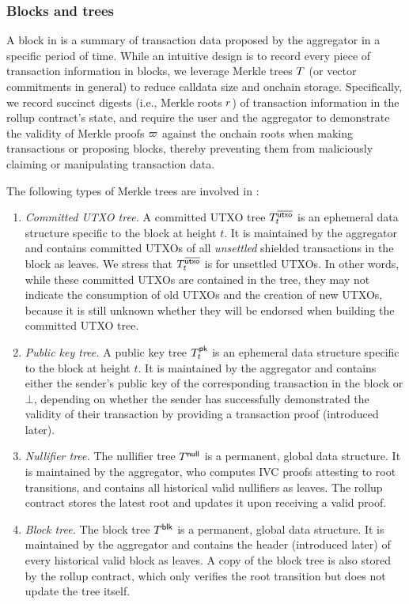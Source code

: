 \subsubsection{Blocks and trees}

A block in \Protocol is a summary of transaction data proposed by the aggregator in a specific period of time.
While an intuitive design is to record every piece of transaction information in blocks, we leverage Merkle trees $T$ (or vector commitments in general) to reduce calldata size and onchain storage.
Specifically, we record succinct digests (i.e., Merkle roots $r$) of transaction information in the rollup contract's state, and require the user and the aggregator to demonstrate the validity of Merkle proofs $\varpi$ against the onchain roots when making transactions or proposing blocks, thereby preventing them from maliciously claiming or manipulating transaction data.

The following types of Merkle trees are involved in \Protocol:

\begin{enumerate}
    \item \textit{Committed \ac{UTXO} tree.}
    A committed \ac{UTXO} tree $T^{\overline{\mathsf{utxo}}}_t$ is an ephemeral data structure specific to the block at height $t$.
    It is maintained by the aggregator and contains committed \acp{UTXO} of all \textit{unsettled} shielded transactions in the block as leaves.
    We stress that $T^{\overline{\mathsf{utxo}}}_t$ is for unsettled \acp{UTXO}.
    In other words, while these committed UTXOs are contained in the tree, they may not indicate the consumption of old \acp{UTXO} and the creation of new \acp{UTXO}, 
    because it is still unknown whether they will be endorsed when building the committed \ac{UTXO} tree.
    \item \textit{Public key tree.}
    A public key tree $T^{\mathsf{pk}}_t$ is an ephemeral data structure specific to the block at height $t$.
    It is maintained by the aggregator and contains either the sender's public key of the corresponding transaction in the block or $\bot$, depending on whether the sender has successfully demonstrated the validity of their transaction by providing a transaction proof (introduced later).
    \item \textit{Nullifier tree.}
    The nullifier tree $T^\mathsf{null}$ is a permanent, global data structure.
    It is maintained by the aggregator, who computes \ac{IVC} proofs attesting to root transitions, and contains all historical valid nullifiers as leaves. The rollup contract stores the latest root and updates it upon receiving a valid proof.
    \item \textit{Block tree.}
    The block tree $T^\mathsf{blk}$ is a permanent, global data structure.
    It is maintained by the aggregator and contains the header (introduced later) of every historical valid block as leaves.
    A copy of the block tree is also stored by the rollup contract, which only verifies the root transition but does not update the tree itself.
\end{enumerate}

